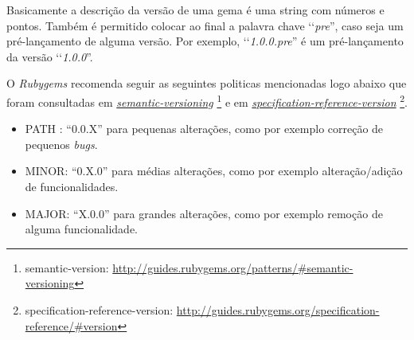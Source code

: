 Basicamente a descrição da versão de uma gema é uma string com números e pontos. Também é permitido
colocar ao final a palavra chave ‘‘\emph{pre}'', caso seja um pré-lançamento de alguma versão.
Por exemplo, ‘‘\emph{1.0.0.pre}'' é um pré-lançamento da versão ‘‘\emph{1.0.0}''.

O \emph{Rubygems} recomenda seguir as seguintes politicas mencionadas logo abaixo que foram consultadas
em \emph{\href{http://guides.rubygems.org/patterns/\#semantic-versioning}{semantic-versioning}}
\footnote{semantic-version: \url{http://guides.rubygems.org/patterns/\#semantic-versioning}} e em
\emph{\href{http://guides.rubygems.org/specification-reference/\#version}{specification-reference-version}}
\footnote{specification-reference-version: \url{http://guides.rubygems.org/specification-reference/\#version}}.

\begin{itemize}
 \item PATH : “0.0.X” para pequenas alterações, como por exemplo correção de pequenos \emph{bugs}.
 \item MINOR: “0.X.0” para médias alterações, como por exemplo alteração/adição de funcionalidades.
 \item MAJOR: “X.0.0” para grandes alterações, como por exemplo remoção de alguma funcionalidade.
\end{itemize}

